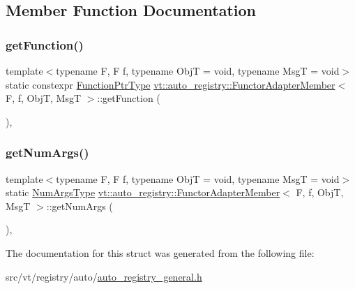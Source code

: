 \subsection{Member Function Documentation}
\mbox{\label{structvt_1_1auto__registry_1_1_functor_adapter_member_a38bac2340fba8175700a58b5bf129126}} 
\subsubsection{\texorpdfstring{get\+Function()}{getFunction()}}
{\footnotesize\ttfamily template$<$typename F, F f, typename ObjT = void, typename MsgT = void$>$ \\
static constexpr \hyperlink{structvt_1_1auto__registry_1_1_functor_adapter_member_a024b0fba6787d70e73f21f171bd69f51}{Function\+Ptr\+Type} \hyperlink{structvt_1_1auto__registry_1_1_functor_adapter_member}{vt\+::auto\+\_\+registry\+::\+Functor\+Adapter\+Member}$<$ F, f, ObjT, MsgT $>$\+::get\+Function (\begin{DoxyParamCaption}{ }\end{DoxyParamCaption})\hspace{0.3cm}{\ttfamily [inline]}, {\ttfamily [static]}}

\mbox{\label{structvt_1_1auto__registry_1_1_functor_adapter_member_aa91ec67a8621684f13d2ec4d85be9042}} 
\subsubsection{\texorpdfstring{get\+Num\+Args()}{getNumArgs()}}
{\footnotesize\ttfamily template$<$typename F, F f, typename ObjT = void, typename MsgT = void$>$ \\
static \hyperlink{namespacevt_1_1auto__registry_aebda1d9d765bc9147dc654ad0712c936}{Num\+Args\+Type} \hyperlink{structvt_1_1auto__registry_1_1_functor_adapter_member}{vt\+::auto\+\_\+registry\+::\+Functor\+Adapter\+Member}$<$ F, f, ObjT, MsgT $>$\+::get\+Num\+Args (\begin{DoxyParamCaption}{ }\end{DoxyParamCaption})\hspace{0.3cm}{\ttfamily [inline]}, {\ttfamily [static]}}



The documentation for this struct was generated from the following file\+:\begin{DoxyCompactItemize}
\item 
src/vt/registry/auto/\hyperlink{auto__registry__general_8h}{auto\+\_\+registry\+\_\+general.\+h}\end{DoxyCompactItemize}

